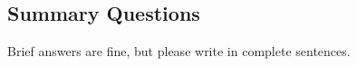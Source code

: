 \begin{questions}
\end{questions}


%
%
%
%
%
%
%
%
%

\subsection*{Summary Questions}

Brief answers are fine, but please write in complete sentences.

